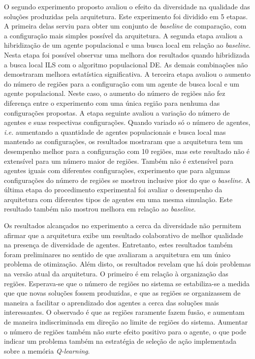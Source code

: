 O segundo experimento proposto avaliou o efeito da diversidade na qualidade das soluções produzidas pela arquitetura. Este experimento foi dividido em 5 etapas. A primeira delas serviu para obter um conjunto de \textit{baseline} de comparação, com a configuração mais simples possível da arquitetura. A segunda etapa avaliou a hibridização de um agente populacional e uma busca local em relação ao \textit{baseline}. Nesta etapa foi possível observar uma melhora dos resultados quando hibridizada a busca local ILS com o algoritmo populacional DE. As demais combinações não demostraram melhora estatística significativa. A terceira etapa avaliou o aumento do número de regiões para a configuração com um agente de busca local e um agente populacional. Neste caso, o aumento do número de regiões não fez diferença entre o experimento com uma única região para nenhuma das configurações propostas. A etapa seguinte avaliou a variação do número de agentes e suas respectivas configurações. Quando variado só o número de agentes, \textit{i.e.} aumentando a quantidade de agentes populacionais e busca local mas mantendo as configurações, os resultados mostraram que a arquitetura tem um desempenho melhor para a configuração com 10 regiões, mas este resultado não é extensível para um número maior de regiões. Também não é extensível para agentes iguais com diferentes configurações, experimento que para algumas configurações do número de regiões se mostrou inclusive pior do que o \textit{baseline}. A última etapa do procedimento experimental foi avaliar o desempenho da arquitetura com diferentes tipos de agentes em uma mesma simulação. Este resultado também não mostrou melhora em relação ao \textit{baseline}.

Os resultados alcançados no experimento a cerca da diversidade não permitem afirmar que a arquitetura exibe um resultado colaborativo de melhor qualidade na presença de diversidade de agentes. Entretanto, estes resultados também foram preliminares no sentido de que avaliaram a arquitetura em um único problema de otimização. Além disto, os resultados revelam que há dois problemas na versão atual da arquitetura. O primeiro é em relação à organização das regiões. Esperava-se que o número de regiões no sistema se estabiliza-se a medida que que novas soluções fossem produzidas, e que as regiões se organizassem de maneira a facilitar o aprendizado dos agentes a cerca das soluções mais interessantes. O observado é que as regiões raramente fazem fusão, e aumentam de maneira indiscriminada em direção ao limite de regiões do sistema. Aumentar o número de regiões também não surte efeito positivo para o agente, o que pode indicar um problema também na estratégia de seleção de ação implementada sobre a memória \textit{Q-learning}. 

